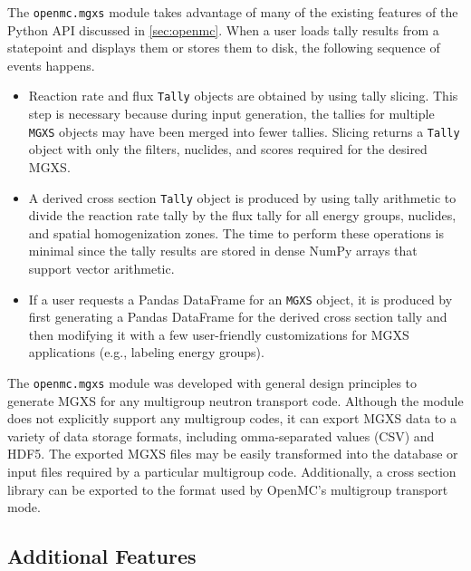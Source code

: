The \texttt{openmc.mgxs} module takes advantage of many of the existing features of the Python API discussed in \cref{sec:openmc}. When a user loads tally results from a statepoint and displays them or stores them to disk, the following sequence of events happens.

\begin{itemize}[noitemsep]
\item Reaction rate and flux \texttt{Tally} objects are obtained by using tally slicing. This step is necessary because during input generation, the tallies for multiple \texttt{MGXS} objects may have been merged into fewer tallies. Slicing returns a \texttt{Tally} object with only the filters, nuclides, and scores required for the desired MGXS.
\item A derived cross section \texttt{Tally} object is produced by using tally arithmetic to divide the reaction rate tally by the flux tally for all energy groups, nuclides, and spatial homogenization zones. The time to perform these operations is minimal since the tally results are stored in dense NumPy arrays that support vector arithmetic.
\item If a user requests a Pandas DataFrame for an \texttt{MGXS} object, it is produced by first generating a Pandas DataFrame for the derived cross section tally and then modifying it with a few user-friendly customizations for MGXS applications (\textrm{e.g.}, labeling energy groups).
\end{itemize}

The \texttt{openmc.mgxs} module was developed with general design principles to generate MGXS for any multigroup neutron transport code. Although the module does not explicitly support any multigroup codes, it can export MGXS data to a variety of data storage formats, including omma-separated values (CSV) and HDF5. The exported MGXS files may be easily transformed into the database or input files required by a particular multigroup code. Additionally, a cross section library can be exported to the format used by OpenMC's multigroup transport mode.

\subsection{Additional Features}
\label{sec:features}


